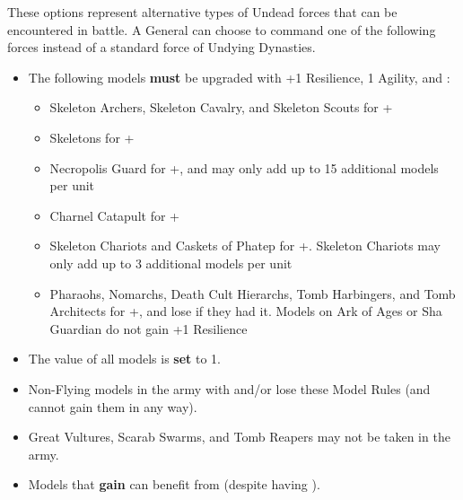 

These options represent alternative types of Undead forces that can be encountered in battle. A \pharaoh{} General can choose to command one of the following forces instead of a standard force of Undying Dynasties.

\subtitle{\commanderoftheterracottaarmy}

\begin{itemize}
\item The following models \textbf{must} be upgraded with +1 Resilience, \minuss{}1 Agility, and \textbf{\ensouledstatue}:

\begin{itemize}
\item Skeleton Archers, Skeleton Cavalry, and Skeleton Scouts for +\permodel{}
\item Skeletons for +\permodel{}
\item Necropolis Guard for +\permodel{}, and may only add up to 15 additional models per unit
\item Charnel Catapult for +\permodel{}
\item \rnf{} Skeleton Chariots and Caskets of Phatep for +\permodel{}. Skeleton Chariots may only add up to 3 additional models per unit
\item Pharaohs, Nomarchs, Death Cult Hierarchs, Tomb Harbingers, and Tomb Architects for +\permodel{}, and lose \flammable{} if they had it. Models on Ark of Ages or Sha Guardian do not gain +1 Resilience
\end{itemize}

\item The \resurrected{} value of all models is \textbf{set} to 1.

\item Non-Flying models in the army with \undergroundambush{} and/or \lighttroops{} lose these Model Rules (and cannot gain them in any way). 

\item Great Vultures, Scarab Swarms, and Tomb Reapers may not be taken in the army.

\item Models that \textbf{gain} \ensouledstatue{} can benefit from \undyingwill{} (despite having \ensouledstatue{}).
\end{itemize}

\subtitle{\lordofthebarrowlegion}


